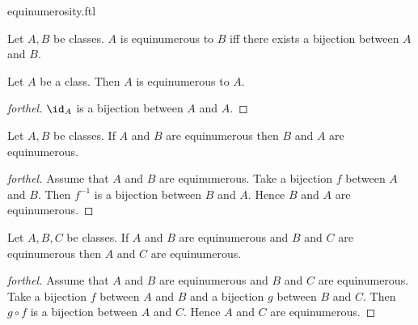 \documentclass{naproche-library}
\begin{document}
\begin{smodule}[title=Equinumerosity]{equinumerosity.ftl}

\begin{definition}[forthel,id=FOUNDATIONS_13_4578620297183232]
  Let $A, B$ be classes.
  $A$ is equinumerous to $B$ iff there exists a bijection between $A$ and $B$.
\end{definition}

\begin{proposition}[forthel,id=FOUNDATIONS_13_3703161885818880]
  Let $A$ be a class.
  Then $A$ is equinumerous to $A$.
\end{proposition}
\begin{proof}[forthel]
  $\id_{A}$ is a bijection between $A$ and $A$.
\end{proof}

\begin{proposition}[forthel,id=FOUNDATIONS_13_8050301789536256]
  Let $A, B$ be classes.
  If $A$ and $B$ are equinumerous then $B$ and $A$ are equinumerous.
\end{proposition}
\begin{proof}[forthel]
  Assume that $A$ and $B$ are equinumerous.
  Take a bijection $f$ between $A$ and $B$.
  Then $f^{-1}$ is a bijection between $B$ and $A$.
  Hence $B$ and $A$ are equinumerous.
\end{proof}

\begin{proposition}[forthel,id=FOUNDATIONS_13_3609912414306304]
  Let $A, B, C$ be classes.
  If $A$ and $B$ are equinumerous and $B$ and $C$ are equinumerous then $A$ and $C$ are equinumerous.
\end{proposition}
\begin{proof}[forthel]
  Assume that $A$ and $B$ are equinumerous and $B$ and $C$ are equinumerous.
  Take a bijection $f$ between $A$ and $B$ and a bijection $g$ between $B$ and $C$.
  Then $g \circ f$ is a bijection between $A$ and $C$.
  Hence $A$ and $C$ are equinumerous.
\end{proof}
\end{smodule}
\end{document}
